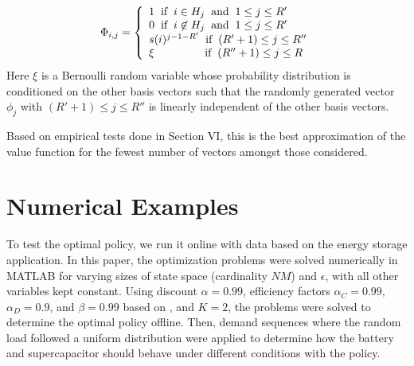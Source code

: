\documentclass[conference]{IEEEtran}
\begin{document}
    \begin{displaymath}
        \Phi_{i,j}=\left\{
            \begin{array}{l}
            1 \hspace{0.2cm} \text{if} \hspace{0.2cm} i\in H_{j} \hspace{0.2cm} \text{and} \hspace{0.2cm} 1\leq j\leq R'\\
            0 \hspace{0.2cm} \text{if} \hspace{0.2cm} i\not\in H_{j} \hspace{0.2cm} \text{and} \hspace{0.2cm} 1\leq j\leq R'\\
            s(i)^{j-1-R'} \hspace{0.2cm} \text{if} \hspace{0.2cm} (R'+1)\leq j\leq R''\\
            \xi \hspace{1.6cm} \text{if} \hspace{0.2cm} (R''+1)\leq j\leq R
            \end{array}
            \right.
    \end{displaymath} Here $\xi$ is a Bernoulli random variable whose probability distribution is conditioned on the other basis vectors such that the randomly generated vector $\phi_{j}$ with $(R'+1)\leq j\leq R''$ is linearly independent of the other basis vectors.
    
    Based on empirical tests done in Section VI, this is the best approximation of the value function for the fewest number of vectors amongst those considered.
    
    

\section{Numerical Examples}
To test the optimal policy, we run it online with data based on the energy storage application. In this paper, the optimization problems were solved numerically in MATLAB for varying sizes of state space (cardinality $NM$) and $\epsilon$, with all other variables kept constant. Using discount $\alpha=0.99$, efficiency factors $\alpha_{C}=0.99$, $\alpha_{D}=0.9$, and $\beta=0.99$ based on \cite{su2013modeling}, and $K=2$, the problems were solved to determine the optimal policy offline. Then, demand sequences where the random load followed a uniform distribution were applied to determine how the battery and supercapacitor should behave under different conditions with the policy.
\end{document}
